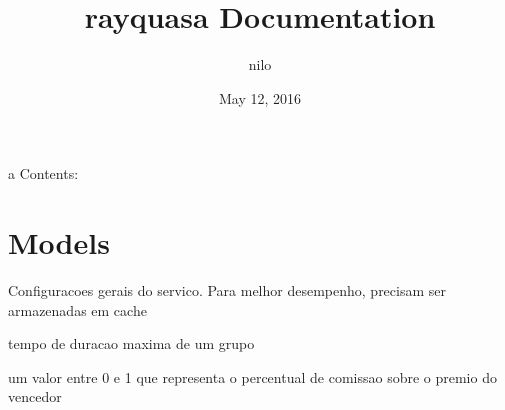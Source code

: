 \documentclass[letterpaper,10pt,english]{sphinxmanual}
\title{rayquasa Documentation}
\date{May 12, 2016}
\author{nilo}
\begin{document}
\maketitle
\tableofcontents
{}\label{index::doc}


a
Contents:


\chapter{Models}
\label{modules/models:models}\label{modules/models::doc}\label{modules/models:welcome-to-rayquasa-s-documentation}\label{modules/models:module-ubet.models}

\begin{fulllineitems}
\label{modules/models:ubet.models.Admin_settings}
Configuracoes gerais do servico. Para melhor desempenho, precisam ser armazenadas em cache

\begin{fulllineitems}
\label{modules/models:ubet.models.Admin_settings.time_to_expire}
tempo de duracao maxima de um grupo

\end{fulllineitems}


\begin{fulllineitems}
\label{modules/models:ubet.models.Admin_settings.win_tax}
um valor entre 0 e 1 que representa o percentual de comissao sobre o premio
do vencedor

\end{fulllineitems}


\end{fulllineitems}

\end{document}
